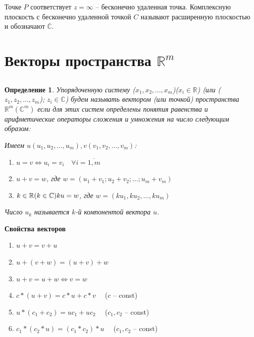 \documentclass[a4paper,oneside]{article}
\newtheorem{definition}{Определение}[subsection]
\begin{document}
Точке $P$ соответствует $z = \infty$ -- бесконечно удаленная точка.
Комплексную плоскость с бесконечно удаленной точкой $C$ называют
расширенную плоскостью и обозначают $\overline{\mathbb{C}}$.

\section{Векторы пространства $\mathbb{R}^m$}

\subsection{}

\begin{definition}
    Упорядоченную систему ($x_1, x_2, \dots, x_m$)($x_i \in \mathbb{R}$)
    (или ($z_1, z_2, \dots, z_m$); $z_i \in \mathbb{C}$) будем называть вектором
    (или точкой) пространства $\mathbb{R}^m (\mathbb{C}^m)$ если для этих
    систем определены понятия равенства и арифметические операторы сложения
    и умножения на число следующим образом:
    
    Имеем $u(u_1, u_2, \dots, u_m), v(v_1, v_2, \dots, v_m)$:
    
    \begin{enumerate}
        \item $u = v \Leftrightarrow u_i = v_i \quad \forall i = \overline{1, m}$
        \item $u + v = w$, где $w = (u_1 + v_1; u_2 + v_2; \dots; u_m + v_m)$
        \item $k \in \mathbb{R} (k \in \mathbb{C}) \\
        ku = w$, где $w = (k u_1, k u_2, \dots, k u_m)$
    \end{enumerate}
    
    Число $u_k$ называется $k$-й компонентой вектора $u$.
\end{definition}

\textbf{Свойства векторов}
\begin{enumerate}
    \item $u + v = v + u$
    \item $u + (v + w) = (u + v) + w$
    \item $u + v = u + w \Leftrightarrow v = w$
    \item $c * (u + v) = c * u + c * v \quad$ ($c$ -- const)
    \item $u * (c_1 + c_2) = u c_1 + u c_2 \quad$ ($c_1, c_2$ -- const)
    \item $c_1 * (c_2 * u) = (c_1 * c_2) * u \quad$ ($c_1, c_2$ -- const)
\end{enumerate}
\end{document}

